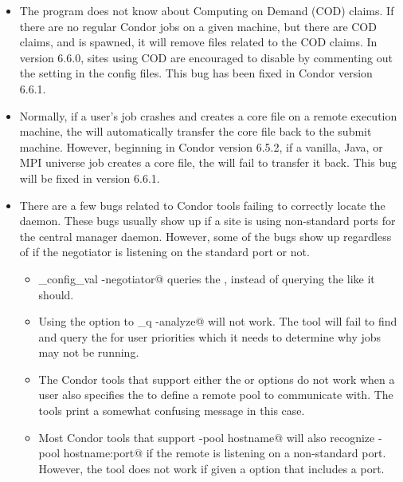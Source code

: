 \begin{itemize}

\item The  program does not know about Computing on
  Demand (COD) claims.
  If there are no regular Condor jobs on a given machine, but there
  are COD claims, and  is spawned, it will remove files
  related to the COD claims.
  In version 6.6.0, sites using COD are encouraged to disable
   by commenting out the  setting in the
  config files.
  This bug has been fixed in Condor version 6.6.1.

\item Normally, if a user's job crashes and creates a core file on a
  remote execution machine, the  will automatically
  transfer the core file back to the submit machine.
  However, beginning in Condor version 6.5.2, if a vanilla, Java, or
  MPI universe job creates a core file, the  will fail
  to transfer it back.
  This bug will be fixed in version 6.6.1.
  
\item There are a few bugs related to Condor tools failing to
  correctly locate the  daemon.
  These bugs usually show up if a site is using non-standard ports for
  the central manager daemon.
  However, some of the bugs show up regardless of if the negotiator is
  listening on the standard port or not. 

  \begin{itemize}
    \item \verb@condor_config_val -negotiator@ queries the
          , instead of querying the
           like it should.  

    \item Using the  option to \verb@condor_q -analyze@
          will not work.
          The tool will fail to find and query the 
          for user priorities which it needs to determine why jobs may
          not be running.

    \item The Condor tools that support either the 
          or  options do not work when a user also
          specifies the  to define a remote pool to
          communicate with.
          The tools print a somewhat confusing message in this case.

    \item Most Condor tools that support \verb@-pool hostname@ will
          also recognize \verb@-pool hostname:port@ if the remote
           is listening on a non-standard port.
          However, the  tool does not work if given a
           option that includes a port.

  \end{itemize}

\end{itemize}

